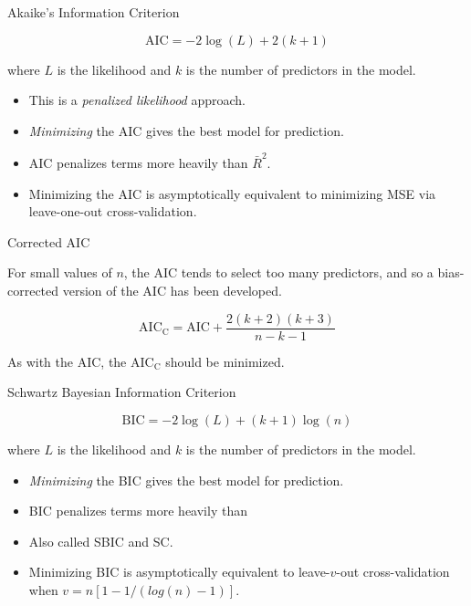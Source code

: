 \documentclass[14pt]{beamer}
\makeatletter
\def\biz{\begin{itemize}[<+-| alert@+>]}
\def\eiz{\end{itemize}}
\makeatother
\begin{document}
\begin{frame}{Akaike's Information Criterion}

\begin{block}{}
\[
\text{AIC} = -2\log(L) + 2(k+1)
\]
\end{block}
where $L$ is the likelihood and $k$ is the number of predictors in the model.\pause

\biz
\item This is a \emph{penalized likelihood} approach.

\item \emph{Minimizing} the AIC gives the best model for prediction.

\item AIC penalizes terms more heavily than $\bar{R}^2$.

\item Minimizing the AIC is asymptotically equivalent to minimizing MSE via leave-one-out cross-validation.
\eiz

\end{frame}

\begin{frame}{Corrected AIC}

For small values of $n$, the AIC tends to select too many predictors, and so a bias-corrected version of the AIC has been developed.
\begin{block}{}
\[
\text{AIC}_{\text{C}} = \text{AIC} + \frac{2(k+2)(k+3)}{n-k-1}
\]
\end{block}
As with the AIC, the AIC$_{\text{C}}$ should be minimized.
\end{frame}

\begin{frame}{\normalsize Schwartz Bayesian Information Criterion}

\begin{block}{}
\[
\text{BIC} = -2\log(L) + (k+1)\log(n)
\]
\end{block}
where $L$ is the likelihood and $k$ is the number of predictors in the model.\pause

\biz
\item \emph{Minimizing} the BIC gives the best model for prediction.

\item BIC penalizes terms more heavily than 

\item Also called SBIC and SC.

\item Minimizing BIC is asymptotically equivalent to leave-$v$-out cross-validation when $v = n[1-1/(log(n)-1)]$.

\eiz

\end{frame}
\end{document}
